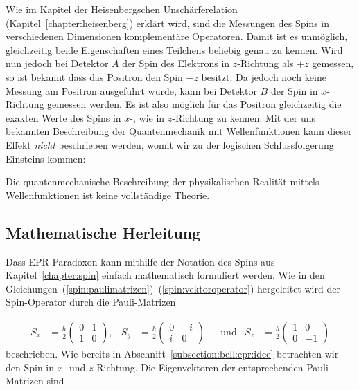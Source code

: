 \begin{refsection}
Wie im Kapitel der Heisenbergschen Unsch\"arferelation 
(Kapitel~\ref{chapter:heisenberg})
erkl\"art wird, sind die Messungen des Spins in verschiedenen Dimensionen 
komplement\"are Operatoren.
Damit ist es unm\"oglich, gleichzeitig beide Eigenschaften eines Teilchens
beliebig genau zu kennen.
Wird nun jedoch bei Detektor $A$ der Spin des Elektrons in $z$-Richtung 
als $+z$ gemessen, so ist bekannt dass das Positron den Spin $-z$ besitzt.
Da jedoch noch keine Messung am Positron ausgef\"uhrt wurde, kann bei
Detektor $B$ der Spin in $x$-Richtung gemessen werden.
Es ist also m\"oglich f\"ur das Positron gleichzeitig die exakten Werte 
des Spins in $x$-, wie in $z$-Richtung zu kennen. 
Mit der uns bekannten Beschreibung der Quantenmechanik mit Wellenfunktionen
kann dieser Effekt \emph{nicht} beschrieben werden, womit wir zu der
logischen Schlussfolgerung Einsteins kommen:

\begin{satz}
    Die quantenmechanische Beschreibung der physikalischen Realit\"at mittels
    Wellenfunktionen ist keine vollst\"andige Theorie.
\end{satz}

\subsection{Mathematische Herleitung\label{subsection:bell:epr:herleitung}}
Dass EPR Paradoxon kann mithilfe der Notation des Spins aus 
Kapitel~\ref{chapter:spin}  einfach mathematisch formuliert werden.
Wie in den Gleichungen~(\ref{spin:paulimatrizen})--(\ref{spin:vektoroperator})
hergeleitet wird der Spin-Operator durch die Pauli-Matrizen

\begin{align}
    S_x &= \frac{\hbar}{2} \begin{pmatrix}
    0 & 1 \\ 1 & 0
    \end{pmatrix},
    &
    S_y &= \frac{\hbar}{2} \begin{pmatrix}
    0 & -i \\ i & 0
    \end{pmatrix}
    &&\text{und}
    &
    S_z &= \frac{\hbar}{2} \begin{pmatrix}
    1 & 0 \\ 0 & -1
    \end{pmatrix}\label{equ:bell:paulimatrizen}
\end{align}
beschrieben.
Wie bereits in Abschnitt~\ref{subsection:bell:epr:idee} betrachten 
wir den Spin in $x$- und $z$-Richtung.
Die Eigenvektoren der entsprechenden Pauli-Matrizen sind


\end{refsection}
